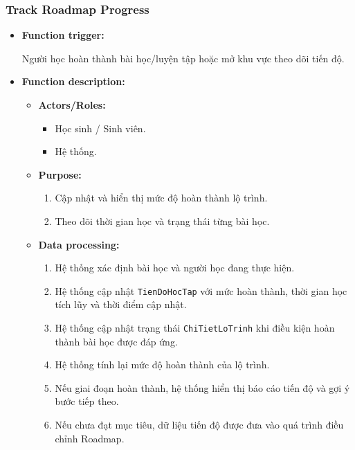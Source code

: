 \documentclass[12pt,a4paper,oneside]{report}
\begin{document}
\subsubsection{Track Roadmap Progress}
\label{subsubsec:track-roadmap-progress}

\begin{itemize}

    \item \textbf{Function trigger:}

    Người học hoàn thành bài học/luyện tập hoặc mở khu vực theo dõi tiến độ.

    \item \textbf{Function description:}

    \begin{itemize}

        \item \textbf{Actors/Roles:}
        \begin{itemize}
            \item Học sinh / Sinh viên.
            \item Hệ thống.
        \end{itemize}

        \item \textbf{Purpose:}
        \begin{enumerate}
            \item Cập nhật và hiển thị mức độ hoàn thành lộ trình.
            \item Theo dõi thời gian học và trạng thái từng bài học.
        \end{enumerate}

        \item \textbf{Data processing:}
        \begin{enumerate}
            \item Hệ thống xác định bài học và người học đang thực hiện.
            \item Hệ thống cập nhật \texttt{TienDoHocTap} với mức hoàn thành, thời gian học tích lũy và thời điểm cập nhật.
            \item Hệ thống cập nhật trạng thái \texttt{ChiTietLoTrinh} khi điều kiện hoàn thành bài học được đáp ứng.
            \item Hệ thống tính lại mức độ hoàn thành của lộ trình.
            \item Nếu giai đoạn hoàn thành, hệ thống hiển thị báo cáo tiến độ và gợi ý bước tiếp theo.
            \item Nếu chưa đạt mục tiêu, dữ liệu tiến độ được đưa vào quá trình điều chỉnh Roadmap.
        \end{enumerate}


\end{itemize}
\end{itemize}
\end{document}
